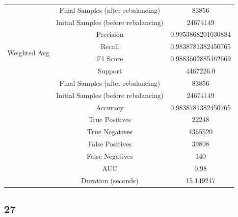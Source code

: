 \begin{longtable}{|c|c|c|}
 & Final Samples (after rebalancing) & 83856 \\
 & Initial Samples (before rebalancing) & 24674149 \\
\hline
\multirow{4}{*}{Weighted Avg} & Precision & 0.9953868201030884 \\
 & Recall & 0.9838781382450765 \\
 & F1 Score & 0.9883602885462669 \\
 & Support & 4467226.0 \\
 & Final Samples (after rebalancing) & 83856 \\
 & Initial Samples (before rebalancing) & 24674149 \\
\hline
& Accuracy & 0.9838781382450765 \\ \hline
& True Positives & 22248 \\ \hline
& True Negatives & 4365520 \\ \hline
& False Positives & 39808 \\ \hline
& False Negatives & 140 \\ \hline
& AUC & 0.98 \\ \hline
& Duration (seconds) & 15.149247 \\ \hline
\end{longtable}


\subsection{27}

